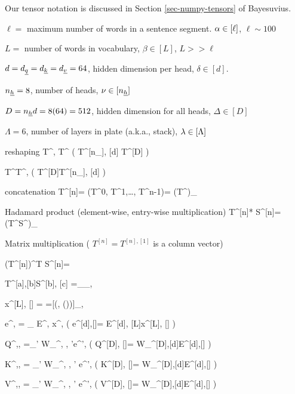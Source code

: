 \documentclass[12pt]{article}
\begin{document}
Our tensor notation is discussed in Section 
\ref{sec-numpy-tensors} of Bayesuvius.



$\ell=$ maximum number of words in a sentence segment. $\alpha\in [\ell]$, $\ell\sim 100$

$L=$ number of words in vocabulary, $\beta\in[L]$, $L>> \ell$

$d=d_{\underline{q}}=d_{\underline{k}}=d_{\underline{v}}=64$, hidden dimension  per head,
$\delta\in[d]$. 

$n_{\underline{h}}=8$, number of heads, $\nu \in[n_{\underline{h}}]$

$D=n_{\underline{h}} d=8(64)=512$, hidden dimension for all heads,
$\Delta\in [D]$

$\Lambda=6$, number of layers in plate (a.k.a., stack), $\lambda\in[\Lambda]$

reshaping
\beq
T^{\nu, \delta}\rarrow T^{\Delta}
\;\;
\left(
T^{[n_\rvh], [d]} \rarrow T^{[D]}
\right)
\eeq

\beq
T^{\Delta}\rarrow T^{\nu, \delta}
\;\;
\left(
T^{[D]}\rarrow T^{[n_\rvh], [d]}
\right)
\eeq

concatenation
\beq
T^{[n]}= (T^0, T^1,\ldots, T^{n-1})= 
(T^\nu)_{\nu\in[n]}
\eeq

Hadamard product (element-wise, entry-wise multiplication)
\beq
T^{[n]}* S^{[n]}= (T^\nu S^\nu)_{\nu\in[n]}
\eeq


Matrix multiplication
( $T^{[n]}= T^{[n], [1]}$ is a column vector)

\beq
(T^{[n]})^T S^{[n]}=
\eeq

\beq
T^{[a],[b]}S^{[b], [c]}
=
_{\alp_\in [a], \gamma \in [c]}
\eeq


\beq
x^{[L], [\ell]} = =[\delta(\beta, \beta(\alp))]_{\beta\in[L], \alp\in[\ell]}
\eeq

\beq
e^{\delta, \alp} = \sum_\beta 
E^{\delta, \beta}
x^{\beta, \alp}
\;\;
\left(
e^{[d],[\ell]}= E^{[d], [L]}x^{[L], [\ell]}
\right)
\eeq

\beq
Q^{\nu,\delta, \alp}=\sum_{\delta'}
W_\rvq^{\nu, \delta, \delta'}e^{\delta', \alp}
\;\;
\left(
Q^{[D], [\ell]}=
W_\rvq^{[D],[d]}E^{[d],[\ell]}
\right)
\eeq


\beq
K^{\nu,\delta, \alp}=
\sum_{\delta'}
W_\rvk^{\nu, \delta, \delta'}
e^{\delta', \alp}
\;\;
\left(
K^{[D], [\ell]}=
W_\rvk^{[D],[d]}E^{[d],[\ell]}
\right)
\eeq

\beq
V^{\nu,\delta, \alp}=
\sum_{\delta'}
W_\rvv^{\nu, \delta, \delta'}
e^{\delta', \alp}
\;\;
\left(
V^{[D], [\ell]}=
W_\rvv^{[D],[d]}E^{[d],[\ell]}
\right)
\eeq
\end{document}
